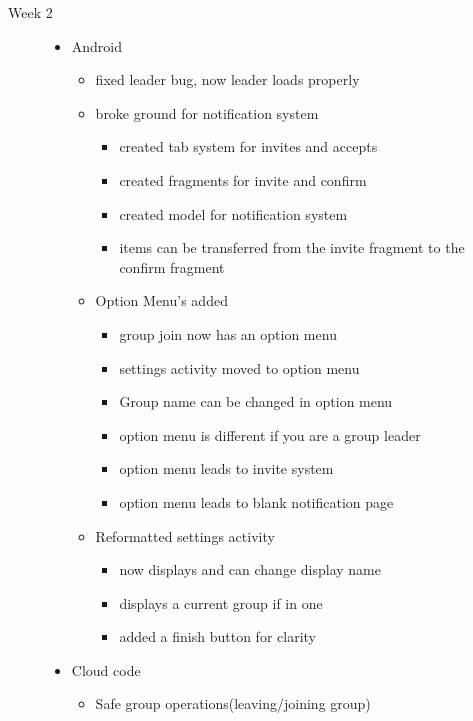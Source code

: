 \begin{description}
  \item[Week 2] \hfill
		\begin{itemize}
		\item Android
		\begin{itemize}
			\item fixed leader bug, now leader loads properly
			\item broke ground for notification system
			\begin{itemize}
				\item created tab system for invites and accepts
				\item created fragments for invite and confirm
				\item created model for notification system
				\item items can be transferred from the invite fragment to the confirm fragment
			\end{itemize}
			\item Option Menu's added 
			\begin{itemize}
				\item group join now has an option menu
				\item settings activity moved to option menu
				\item Group name can be changed in option menu
				\item option menu is different if you are a group leader
				\item option menu leads to invite system
				\item option menu leads to blank notification page
			\end{itemize}
			\item Reformatted settings activity
			\begin{itemize}
				\item now displays and can change display name
				\item displays a current group if in one
				\item added a finish button for clarity
			\end{itemize}
		\end{itemize}
		\item Cloud code
		\begin{itemize}
			\item Safe group operations(leaving/joining group)
		\end{itemize}
	\end{itemize}
  

\end{description}
